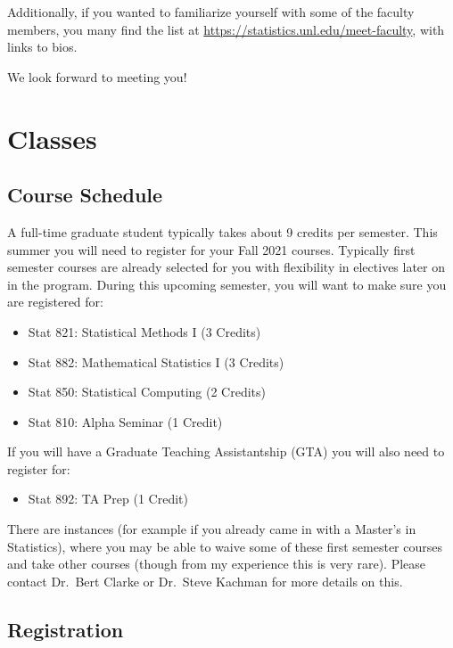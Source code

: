 \documentclass[
  12pt,
]{book}
\providecommand{\tightlist}{%
  \setlength{\itemsep}{0pt}\setlength{\parskip}{0pt}}
\begin{document}
Additionally, if you wanted to familiarize yourself with some of the faculty members, you many find the list at \url{https://statistics.unl.edu/meet-faculty}, with links to bios.

We look forward to meeting you!

\hypertarget{classes}{%
\chapter{Classes}\label{classes}}

\hypertarget{course-schedule}{%
\section{Course Schedule}\label{course-schedule}}

A full-time graduate student typically takes about 9 credits per semester. This summer you will need to register for your Fall 2021 courses. Typically first semester courses are already selected for you with flexibility in electives later on in the program. During this upcoming semester, you will want to make sure you are registered for:

\begin{itemize}
\tightlist
\item
  Stat 821: Statistical Methods I (3 Credits)
\item
  Stat 882: Mathematical Statistics I (3 Credits)
\item
  Stat 850: Statistical Computing (2 Credits)
\item
  Stat 810: Alpha Seminar (1 Credit)
\end{itemize}

If you will have a Graduate Teaching Assistantship (GTA) you will also need to register for:

\begin{itemize}
\tightlist
\item
  Stat 892: TA Prep (1 Credit)
\end{itemize}

There are instances (for example if you already came in with a Master's in Statistics), where you may be able to waive some of these first semester courses and take other courses (though from my experience this is very rare). Please contact Dr.~Bert Clarke or Dr.~Steve Kachman for more details on this.

\hypertarget{registration}{%
\section{Registration}\label{registration}}
\end{document}
